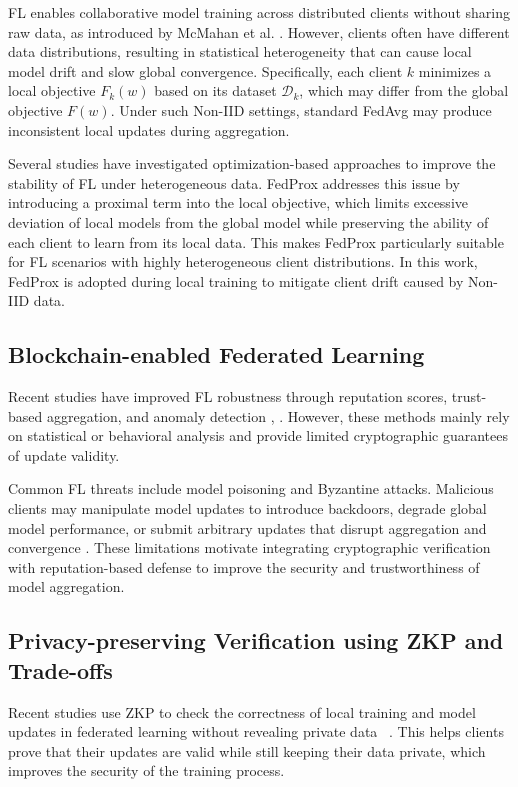 \documentclass[conference, a4paper]{IEEEtran}
\begin{document}
FL enables collaborative model training across distributed clients without sharing raw data, as introduced by McMahan et al. \cite{mcmahan2016communication}. However, clients often have different data distributions, resulting in statistical heterogeneity that can cause local model drift and slow global convergence. Specifically, each client $k$ minimizes a local objective $F_k(w)$ based on its dataset $\mathcal{D}_k$, which may differ from the global objective $F(w)$. Under such Non-IID settings, standard FedAvg may produce inconsistent local updates during aggregation. 

Several studies have investigated optimization-based approaches to improve the stability of FL under heterogeneous data. FedProx addresses this issue \cite{li2020federated} by introducing a proximal term into the local objective, which limits excessive deviation of local models from the global model while preserving the ability of each client to learn from its local data. This makes FedProx particularly suitable for FL scenarios with highly heterogeneous client distributions. In this work, FedProx is adopted during local training to mitigate client drift caused by Non-IID data.

\subsection{Blockchain-enabled Federated Learning}

Recent studies have improved FL robustness through reputation scores, trust-based aggregation, and anomaly detection \cite{wang2023blockchain}, \cite{goh2023blockchain}. However, these methods mainly rely on statistical or behavioral analysis and provide limited cryptographic guarantees of update validity. 

Common FL threats include model poisoning and Byzantine attacks. Malicious clients may manipulate model updates to introduce backdoors, degrade global model performance, or submit arbitrary updates that disrupt aggregation and convergence \cite{xia2023poisoning}. These limitations motivate integrating cryptographic verification with reputation-based defense to improve the security and trustworthiness of model aggregation.

\subsection{Privacy-preserving Verification using ZKP and Trade-offs}

Recent studies use ZKP to check the correctness of local training and model updates in federated learning without revealing private data ~\cite{ma2024vpfl,ebrahimi2024blockchain,wang2025zkfl,bellachia2025verifbfl,reddi2021adaptive}. This helps clients prove that their updates are valid while still keeping their data private, which improves the security of the training process. 
\end{document}
